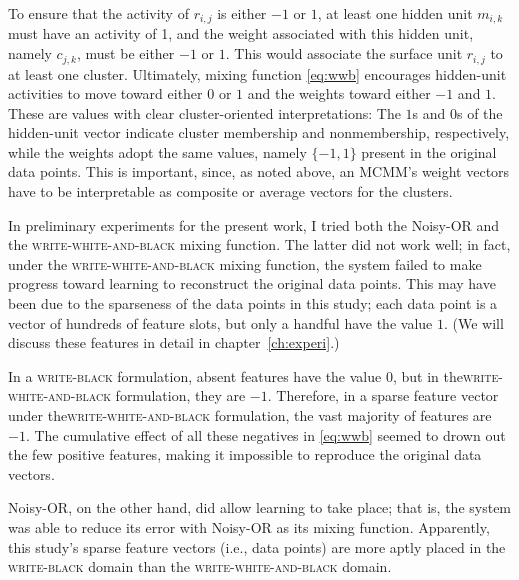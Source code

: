 To ensure that the activity of $r_{i,j}$ is either $-1$ or $1$, at least one hidden 
unit $m_{i,k}$ must have an activity of 1, and the weight associated with this 
hidden unit, namely $c_{j,k}$, must be either $-1$ or $1$. This would associate 
the surface unit $r_{i,j}$ to at least one cluster. Ultimately, mixing 
function \eqref{eq:wwb} encourages hidden-unit activities to move toward 
either $0$ or $1$ and the weights toward either $-1$ and $1$. These are 
values with clear cluster-oriented interpretations: The $1$s and $0$s of the 
hidden-unit vector indicate cluster membership and nonmembership, respectively, 
while the weights adopt the same values, namely $\{-1, 1\}$ present in the original data points. 
This is important, since, as noted above, an MCMM's weight vectors have to be 
interpretable as composite or average vectors for the clusters.

In preliminary experiments for the present work, I tried both the Noisy-OR 
and the \textsc{write-white-and-black} mixing function. The latter did 
not work well; in fact, under the \textsc{write-white-and-black} mixing function, the system 
failed to make progress toward learning to reconstruct the original 
data points. This may have been due to the sparseness of the data points 
in this study; each data point is a vector of hundreds of feature slots, but 
only a handful have the value $1$.
(We will discuss these features in detail in chapter~\ref{ch:experi}.)

In a \textsc{write-black} formulation, absent features have the value $0$, but in the\textsc{write-white-and-black} formulation, they are $-1$. Therefore, in a sparse feature vector under the\textsc{write-white-and-black} formulation, the vast majority of features are $-1$. The cumulative effect of all these negatives in \eqref{eq:wwb} seemed to drown out the few positive features, making it impossible to reproduce the original data vectors. 

Noisy-OR, on the other hand, did allow learning to take place; that is, 
the system was able to reduce its error with Noisy-OR as its mixing function. 
Apparently, this study's sparse feature vectors (i.e., data points) are more aptly 
placed in the \textsc{write-black} domain than the \textsc{write-white-and-black} domain.

